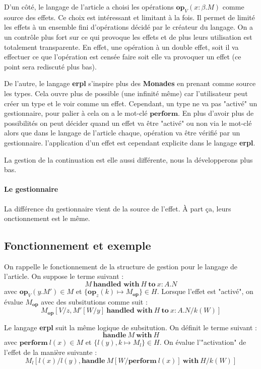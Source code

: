 D'un côté, le langage de l'article a choisi les opérations $\textbf{op}_V(x:\beta.M)$ comme source des effets.
Ce choix est intéressant et limitant à la fois. Il permet de limité les effets à un ensemble fini d'opérations décidé par le créateur du langage. On a un contrôle plus fort sur ce qui provoque les effets et de plus leurs
utilisation est totalement transparente. En effet, une opération à un double effet, soit il va effectuer ce que l'opération
est censée faire soit elle va provoquer un effet (ce point sera rediscuté plus bas).

De l'autre, le langage \textbf{erpl} s'inspire plus des \textbf{Monades} en prenant comme source les types. Cela ouvre
plus de possible (une infinité même) car l'utilisateur peut créer un type et le voir comme un effet. Cependant, un type ne va
pas "activé" un gestionnaire, pour palier à cela on a le mot-clé $\textbf{perform}$. En plus d'avoir plus de possibilités
on peut décider quand un effet va être "activé" ou non via le mot-clé alors que dans le langage de l'article chaque, opération 
va être vérifié par un gestionnaire. l'application d'un effet est cependant explicite dans le langage \textbf{erpl}.

La gestion de la continuation est elle aussi différente, nous la développerons plus bas.

\paragraph{Le gestionnaire} La différence du gestionnaire vient de la source de l'effet. À part ça, leurs onctionnement
est le même.

\subsection{Fonctionnement et exemple}

On rappelle le fonctionnement de la structure de gestion pour le langage de l'article. On suppose
le terme suivant : 
    \[M~\textbf{handled~with}~H~\textbf{to}~x:A.N\]
avec $\textbf{op}_V(y.M') \in M$ et $\{\textbf{op}_z(k) \mapsto M_\textbf{op}\} \in H$. Lorsque l'effet
est "activé", on évalue $M_\textbf{op}$ avec des subsitutions comme suit : 
    \[M_\textbf{op}[V/z,M'[W/y]~\textbf{handled~with}~H~\textbf{to}~x:A.N/k(W)]\]
\bigbreak

Le langage \textbf{erpl} suit la même logique de subsitution. On définit le terme suivant :
    \[\textbf{handle}~M~\textbf{with}~H\]
avec $\textbf{perform}~l(x) \in M$ et $\{ l(y),k \mapsto M_l\} \in H$. On évalue l'"activation" de l'effet de
la manière suivante : 
    \[M_l[l(x)/l(y),\textbf{handle}~M[W/\textbf{perform}~l(x)]~\textbf{with}~H/k(W)]\]


